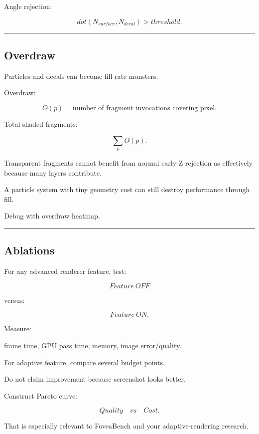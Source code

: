 Angle rejection:

\[
dot(N_{surface},N_{decal})
>
threshold.
\]

\begin{center}\rule{0.5\linewidth}{0.5pt}\end{center}

\subsection{Overdraw}\label{04-visual-computing-ii-ch040-overdraw}

Particles and decals can become fill-rate monsters.

Overdraw:

\[
O(p)
=
\text{number of fragment invocations covering pixel}.
\]

Total shaded fragments:

\[
\sum_pO(p).
\]

Transparent fragments cannot benefit from normal early-Z rejection as effectively because many layers contribute.

A particle system with tiny geometry cost can still destroy performance through fill.

Debug with overdraw heatmap.

\begin{center}\rule{0.5\linewidth}{0.5pt}\end{center}

\subsection{Ablations}\label{04-visual-computing-ii-ch040-ablations}

For any advanced renderer feature, test:

\[
Feature\ OFF
\]

versus:

\[
Feature\ ON.
\]

Measure:

frame time, GPU pass time, memory, image error/quality.

For adaptive feature, compare several budget points.

Do not claim improvement because screenshot looks better.

Construct Pareto curve:

\[
\boxed{
Quality
\quad vs\quad
Cost.
}
\]

That is especially relevant to FoveaBench and your adaptive-rendering research.

